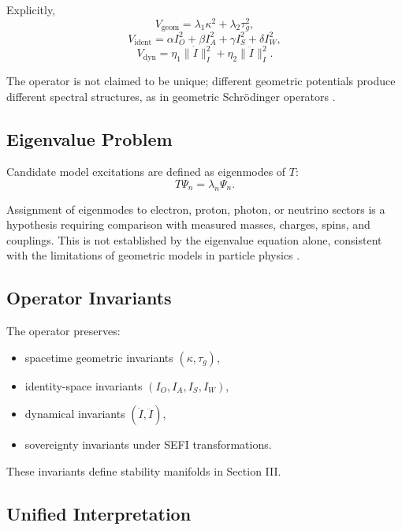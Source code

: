 \documentclass[aip,jmp,reprint,onecolumn,nofootinbib]{revtex4-2}
\begin{document}
Explicitly,
\begin{equation}
V_{\mathrm{geom}}
=
\lambda_1 \kappa^2
+
\lambda_2 \tau_g^2,
\end{equation}
\begin{equation}
V_{\mathrm{ident}}
=
\alpha I_O^2
+
\beta I_A^2
+
\gamma I_S^2
+
\delta I_W^2,
\end{equation}
\begin{equation}
V_{\mathrm{dyn}}
=
\eta_1 \|\dot{I}\|_I^2
+
\eta_2 \|\ddot{I}\|_I^2.
\end{equation}

The operator is not claimed to be unique; different geometric potentials produce different 
spectral structures, as in geometric Schrödinger operators \cite{Helffer}.

\subsection{Eigenvalue Problem}

Candidate model excitations are defined as eigenmodes of $T$:
\begin{equation}
T \Psi_n = \lambda_n \Psi_n.
\end{equation}

Assignment of eigenmodes to electron, proton, photon, or neutrino sectors is a hypothesis 
requiring comparison with measured masses, charges, spins, and couplings. This is not 
established by the eigenvalue equation alone, consistent with the limitations of geometric 
models in particle physics \cite{WeinbergQFT1,PeskinSchroeder}.

\subsection{Operator Invariants}

The operator preserves:
\begin{itemize}
\item spacetime geometric invariants $(\kappa,\tau_g)$,
\item identity-space invariants $(I_O,I_A,I_S,I_W)$,
\item dynamical invariants $(\dot{I},\ddot{I})$,
\item sovereignty invariants under SEFI transformations.
\end{itemize}

These invariants define stability manifolds in Section III.

\subsection{Unified Interpretation}
\end{document}
